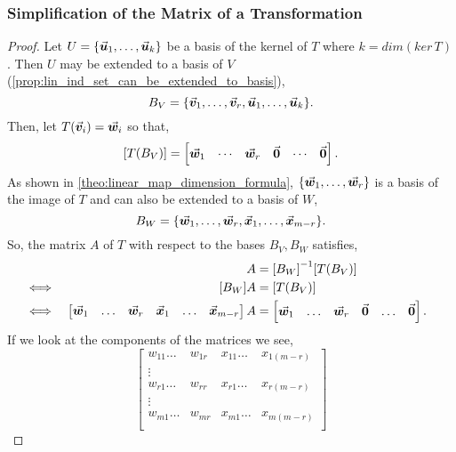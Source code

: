 \documentclass[../MathsNotesBase.tex]{subfiles}
\begin{document}
{		\subsubsection{Simplification of the Matrix of a Transformation}
		\medskip
		\begin{proof}
			Let ${ U = \{\vec{\bm{u}}_1,\dots,\vec{\bm{u}}_k\} }$ be a basis of the kernel of $T$ where ${ k = dim(ker\,T) }$. Then $U$ may be extended to a basis of $V$ (\autoref{prop:lin_ind_set_can_be_extended_to_basis}),
			\[ B_V = \{\vec{\bm{v}}_1,\dots,\vec{\bm{v}}_r,\vec{\bm{u}}_1,\dots,\vec{\bm{u}}_k\}. \]
			Then, let ${ T(\vec{\bm{v}}_i) = \vec{\bm{w}}_i }$ so that,
			\[ [T(B_V)] = \begin{bmatrix}
						\vec{\bm{w}}_1 & \cdots & \vec{\bm{w}}_r & \vec{\bm{0}} & \cdots & \vec{\bm{0}}
						\end{bmatrix}. 
			\]
			As shown in \autoref{theo:linear_map_dimension_formula}, ${ \{ \vec{\bm{w}}_1,\dots,\vec{\bm{w}}_r \} }$ is a basis of the image of $T$ and can also be extended to a basis of $W$,
			\[ B_W = \{ \vec{\bm{w}}_1,\dots,\vec{\bm{w}}_r, \vec{\bm{x}}_1,\dots, \vec{\bm{x}}_{m-r} \}. \]
			So, the matrix $A$ of $T$ with respect to the bases ${ B_V,B_W }$ satisfies,
			\begin{align*}
			&& A &= {[B_W]}^{-1}[T(B_V)] \\
			&\iff & [B_W]A &= [T(B_V)] \\
			&\iff & \begin{bmatrix}\vec{\bm{w}}_1 & \dots & \vec{\bm{w}}_r & \vec{\bm{x}}_1 & \dots & \vec{\bm{x}}_{m-r}\end{bmatrix}A &= 
					\begin{bmatrix}\vec{\bm{w}}_1 & \dots & \vec{\bm{w}}_r & \vec{\bm{0}} & \dots & \vec{\bm{0}}\end{bmatrix}. &\text{\scriptsize{}}
			\end{align*}
			If we look at the components of the matrices we see,
			\[  
				\begin{bmatrix}
				w_{11} \dots & w_{1r} & x_{11} \dots & x_{1(m-r)} \\
				\vdots &  &  &  \\
				w_{r1} \dots & w_{rr} & x_{r1} \dots & x_{r(m-r)} \\
				\vdots &  &  &  \\
				w_{m1} \dots & w_{mr} & x_{m1} \dots & x_{m(m-r)} \\

\end{bmatrix}\]
\end{proof}}
\end{document}
